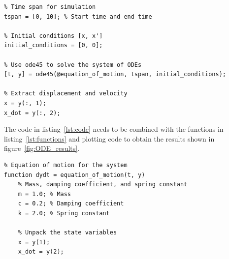 \documentclass[12pt,letter]{article}
\begin{document}
\begin{example}
\begin{lstlisting}
% Time span for simulation
tspan = [0, 10]; % Start time and end time

% Initial conditions [x, x']
initial_conditions = [0, 0];

% Use ode45 to solve the system of ODEs
[t, y] = ode45(@equation_of_motion, tspan, initial_conditions);

% Extract displacement and velocity
x = y(:, 1);
x_dot = y(:, 2);
\end{lstlisting}






%
%
%
%
%
%

The code in listing~\ref{lst:code} needs to be combined with the functions in listing~\ref{lst:functions} and plotting code to obtain the results shown in figure~\ref{fig:ODE_results}.


\begin{lstlisting}
% Equation of motion for the system
function dydt = equation_of_motion(t, y)
	% Mass, damping coefficient, and spring constant
	m = 1.0; % Mass
	c = 0.2; % Damping coefficient
	k = 2.0; % Spring constant
	
	% Unpack the state variables
	x = y(1);
	x_dot = y(2);
	

\end{lstlisting}
\end{example}
\end{document}
